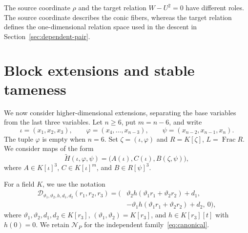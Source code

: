 \documentclass[11pt,reqno]{amsart}
\theoremstyle{definition}
\theoremstyle{remark}
\numberwithin{equation}{section}
\DeclareMathOperator{\Frac}{Frac}
\newcommand{\Ncal}{\mathcal N}
\newcommand{\Dcal}{\mathcal D}
\begin{document}
The source coordinate $\rho$ and the target relation $W-U^2=0$ have different roles. The source coordinate describes the conic fibers, whereas the target relation defines the one-dimensional relation space used in the descent in Section~\ref{sec:dependent-pair}.

\section{Block extensions and stable tameness}\label{sec:blocks}

We now consider higher-dimensional extensions, separating the base variables from the last three variables. Let $n\geq6$, put $m=n-6$, and write
\[
 \iota=(x_1,x_2,x_3),\qquad \varphi=(x_4,\ldots,x_{n-3}),\qquad
 \psi=(x_{n-2},x_{n-1},x_n).
\]
The tuple $\varphi$ is empty when $n=6$. Set $\zeta=(\iota,\varphi)$ and $R=K[\zeta]$, $L=\Frac R$. We consider maps of the form
\begin{equation}\label{eq:block-map}
 \widetilde H(\iota,\varphi,\psi)=\bigl(A(\iota),C(\iota),B(\zeta,\psi)\bigr),
\end{equation}
where $A\in K[\iota]^3$, $C\in K[\iota]^m$, and $B\in R[\psi]^3$.

For a field $K$, we use the notation
\begin{equation}\label{eq:D-family}
 \begin{aligned}
 \Dcal_{\vartheta_1,\vartheta_2,h,d_1,d_2}(r_1,r_2,r_3)
 =\bigl(&\vartheta_2h(\vartheta_1r_1+\vartheta_2r_2)+d_1,\\
       &-\vartheta_1h(\vartheta_1r_1+\vartheta_2r_2)+d_2,\ 0\bigr),
 \end{aligned}
\end{equation}
where $\vartheta_1,\vartheta_2,d_1,d_2\in K[r_3]$, $(\vartheta_1,\vartheta_2)=K[r_3]$, and $h\in K[r_3][t]$ with $h(0)=0$. We retain $\Ncal_P$ for the independent family~\eqref{eq:canonical}.
\end{document}
